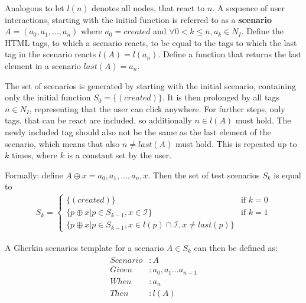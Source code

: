Analogous to \cite{zhang2019scenario} let $l(n)$ denotes all nodes, that react to $n$. A sequence of user interactions, starting with the initial function is referred to as a \textbf{scenario} $A=(a_0,a_1,\ldots, a_n)$ where $a_0=created$ and $\forall0 < k \leq n, a_k \in N_I$. 
Define the HTML tags, to which a scenario reacts, to be equal to the tags to which the last tag in the scenario reacts $l(A)=l(a_n)$. Define a function that returns the last element in a scenario  $last(A) = a_n$.

The set of scenarios is generated by starting with the initial scenario, containing only the initial function $S_0 = \{(created)\}$. It is then prolonged by all tags $n \in N_I$, representing that the user can click anywhere. For further steps, only tags, that can be react are included, so additionally $n \in l(A)$ must hold. The newly included tag should also not be the same as the last element of the scenario, which means that also $n \neq last(A)$ must hold. This is repeated up to $k$ times, where $k$ is a constant set by the user. 

Formally:
define $A \oplus x = a_0,a_1,\ldots,a_n,x$. Then the set of test scenarios $S_k$ is equal to
\begin{align}
    S_k = \begin{cases} 
        \{(created)\} &\mbox{if } k = 0 \\
        \{ p \oplus x |p \in S_{k-1}, x \in \mathcal{I}\} &\mbox{if } k = 1 \\
        \{ p \oplus x |p \in S_{k-1}, x \in l(p) \cap \mathcal{I}, x \neq last(p) \} 
    \end{cases}
\end{align}

A Gherkin scenarios template for a scenario $A \in S_k$ can then be defined as:
\begin{align*}
    \label{math:modifiedkneserneyoptimaldiscounts}
    \begin{split}
    Scenario &: A \\
    Given &: a_0, a_1 \ldots a_{n-1} \\ 
    When &: a_n \\
    Then &: l(A) 
    \end{split}
    \end{align*}